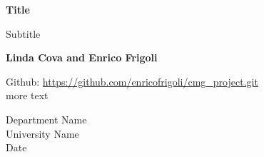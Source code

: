 \begin{titlepage}
    \begin{center}
        \vspace*{1cm}
        
        \Huge
        \textbf{Title}
        
        \vspace{0.5cm}
        \LARGE
        Subtitle
        
        \Large
        \textbf{Linda Cova and Enrico Frigoli}
        
        \vfill
        
        Github: \href{https://github.com/enricofrigoli/cmg_project.git}{https://github.com/enricofrigoli/cmg\_project.git}\\
        more text
        
        \vspace{0.8cm}
        
        
        \Large
        Department Name \\
        University Name \\
        Date
        
    \end{center}

\end{titlepage}
